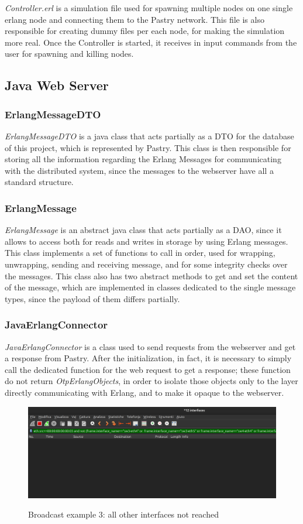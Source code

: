 \documentclass{article}
\begin{document}
\textit{Controller.erl} is a simulation file used for spawning multiple nodes on one single erlang node and connecting them to the Pastry network.
This file is also responsible for creating dummy files per each node, for making the simulation more real.
Once the Controller is started, it receives in input commands from the user for spawning and killing nodes.

\subsection{Java Web Server}

\subsubsection{ErlangMessageDTO}

\textit{ErlangMessageDTO} is a java class that acts partially as a DTO for the database of this project, which is represented by Pastry.
This class is then responsible for storing all the information regarding the Erlang Messages for communicating with the distributed system, 
since the messages to the webserver have all a standard structure.

\subsubsection{ErlangMessage}

\textit{ErlangMessage} is an abstract java class that acts partially as a DAO, since it allows to access both for reads and writes in storage by using 
Erlang messages. This class implements a set of functions to call in order, used for wrapping, unwrapping, sending and receiving message, and 
for some integrity checks over the messages. This class also has two abstract methods to get and set the content of the message, which are implemented in 
classes dedicated to the single message types, since the payload of them differs partially.

\subsubsection{JavaErlangConnector}

\textit{JavaErlangConnector} is a class used to send requests from the webserver and get a response from Pastry.
After the initialization, in fact, it is necessary to simply call the dedicated function for the web request to get a 
response; these function do not return \textit{OtpErlangObjects}, in order to isolate those objects only to the layer 
directly communicating with Erlang, and to make it opaque to the webserver.


\begin{figure}[H]
    \includegraphics[width=12cm, center]{images/3-unreached.png}
    \label{fig:3unreac}
    \caption{Broadcast example 3: all other interfaces not reached}
\end{figure}
\end{document}
